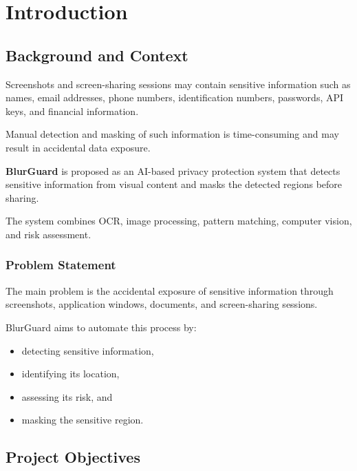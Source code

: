 \documentclass[12pt,a4paper]{tietreport}
\begin{document}
\maketiettitle

\tableofcontents

\clearpage


\chapter{Introduction}

\section{Background and Context}

Screenshots and screen-sharing sessions may contain sensitive information such as names, email addresses, phone numbers, identification numbers, passwords, API keys, and financial information.

Manual detection and masking of such information is time-consuming and may result in accidental data exposure.

\textbf{BlurGuard} is proposed as an AI-based privacy protection system that detects sensitive information from visual content and masks the detected regions before sharing.

The system combines OCR, image processing, pattern matching, computer vision, and risk assessment.

\subsection{Problem Statement}

The main problem is the accidental exposure of sensitive information through screenshots, application windows, documents, and screen-sharing sessions.

BlurGuard aims to automate this process by:

\begin{itemize}
    \item detecting sensitive information,
    \item identifying its location,
    \item assessing its risk, and
    \item masking the sensitive region.
\end{itemize}

\section{Project Objectives}
\end{document}
